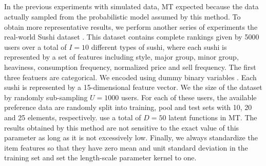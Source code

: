 \DIFaddend 
\DIFaddbegin 

\DIFaddend 

\DIFaddbegin \subsection{}

\DIFaddend In the previous experiments with simulated data, MT \DIFdelbegin {}\DIFdelend \DIFaddbegin {}\DIFaddend expected because the data \DIFdelbegin {}\DIFdelend \DIFaddbegin {}\DIFaddend actually sampled
from the probabilistic model assumed by this method. To obtain more representative results, we perform another series of experiments
\DIFaddbegin {}\DIFaddend the real-world Sushi dataset \citep{kamishima2003}\DIFdelbegin {}%
\DIFdelend .
This dataset contains complete rankings given by 5000 users over a total of $I = 10$ different types of sushi,
where each sushi is represented by a set of features including style, major group, minor group, heaviness, consumption
frequency, normalized price and sell frequency. The first three featuers \DIFaddbegin {}\DIFaddend are categorical. We encoded \DIFdelbegin {}\DIFdelend \DIFaddbegin {}\DIFaddend using dummy binary variables\DIFdelbegin %
\DIFdelend .
Each sushi is represented by a 15-dimensional feature vector. We \DIFdelbegin {}\DIFdelend \DIFaddbegin {}\DIFaddend the size of the dataset by
randomly sub-sampling $U=1000$ users. For each of these users, the available preference data are 
\DIFdelbegin {}\DIFdelend randomly split into training, pool and test sets with 10, 20 and 25 elements, respectively.
\DIFdelbegin {}\DIFdelend \DIFaddbegin {}\DIFaddend use a total of $D=50$ latent functions in MT. 
The results obtained by this method are not \DIFdelbegin {}\DIFdelend sensitive to the exact value of this parameter as long as it is not excessively low.
Finally, we always standardize the item features so that they have zero mean and unit standard deviation in the training set and 
set the length-scale parameter \DIFdelbegin {}\DIFdelend \DIFaddbegin {}\DIFaddend kernel to one. 
